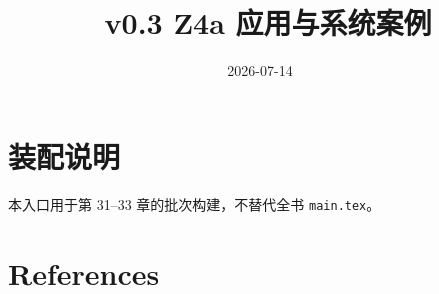 \documentclass[UTF8,a4paper,12pt,openany]{ctexbook}
\title{\ReportTitle\ v0.3 Z4a 应用与系统案例}
\author{\ReportAuthor}
\date{2026-07-14}
\begin{document}
\frontmatter
\maketitle
\chapter*{装配说明}
本入口用于第 31--33 章的批次构建，不替代全书 \texttt{main.tex}。
\tableofcontents
\mainmatter
\setcounter{chapter}{30}



\backmatter
\chapter{References}
\printbibliography[heading=none]
\end{document}
